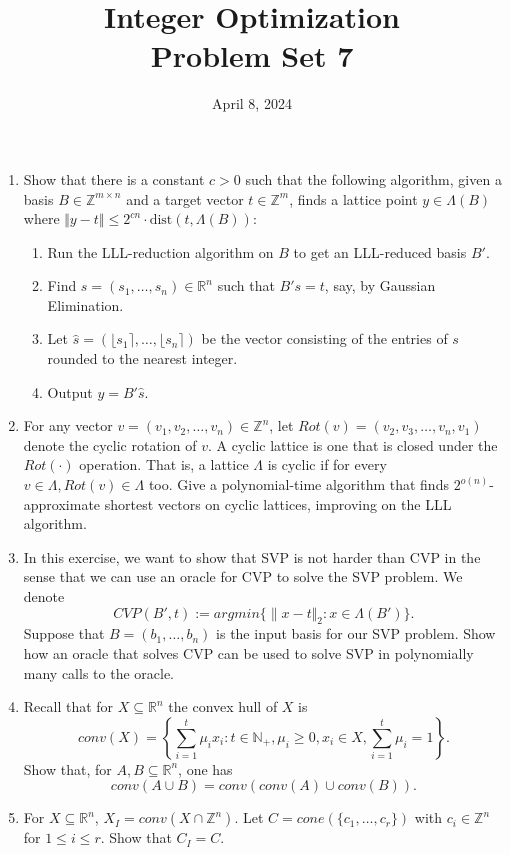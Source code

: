 \documentclass[11pt,a4paper]{article}
\title{Integer Optimization  \\ Problem Set 7 }
\date{ April 8, 2024}
\renewcommand{\leq}{\leqslant}
\renewcommand{\geq}{\geqslant}
\begin{document}
\maketitle 


\begin{enumerate}
\item Show that there is a constant $c > 0$ such that the following algorithm, given a basis $B ∈ \mathbb{Z}^{m×n}$ and a target
vector $t ∈ \mathbb{Z}^m$, finds a lattice point $y ∈ \Lambda(B)$ where
$\Vert y − t \Vert ≤ 2^{cn}  \cdot \text{dist}(t, \Lambda(B))$:
\begin{enumerate}
    \item Run the LLL-reduction algorithm on $B$ to get an LLL-reduced basis $B'$.
    \item Find $s = (s_1, \hdots , s_n) ∈\mathbb{R}^n$ such that $B's = t$, say, by Gaussian Elimination.
    \item Let $\hat{s} =  (⌊s_1⌉,\hdots,⌊s_n⌉)$ be the vector consisting of the entries of $s$ rounded to the nearest integer.
    \item Output $y = B'\hat{s}$.
\end{enumerate}

\item For any vector $v = (v_1,v_2,\hdots,v_n) ∈ \mathbb{Z}^n$, let $Rot(v) = (v_2,v_3,\hdots,v_n,v_1)$ denote the cyclic rotation of $v$. A cyclic lattice is one that is closed under the $Rot(\cdot)$ operation. That is, a lattice $\Lambda$ is cyclic if for every $v ∈ \Lambda, Rot(v) ∈ \Lambda$ too. Give a polynomial-time algorithm that finds $2^{o(n)}$-approximate shortest vectors on cyclic lattices, improving on the LLL algorithm.  

\item In this exercise, we want to show that SVP is not harder than CVP in the sense that we can use an oracle for CVP to solve the SVP problem. We denote $$CVP(B',t):=argmin\{∥x−t\Vert_2:x∈Λ(B')\}.$$ Suppose that $B = (b_1,\hdots,b_n)$ is the input basis for our SVP problem. Show how an oracle that solves CVP can be used to solve SVP in polynomially many calls to the oracle. 

\item Recall that for $X ⊆ \mathbb{R}^n$ the convex hull of $X$ is
 $$conv(X)= \left\{\sum_{i =1}^t μ_ix_i: t∈\mathbb{N}_+,μ_i\geq0,x_i∈X,\sum_{i =1}^t μ_i=1 \right\}.$$
Show that, for $A,B ⊆\mathbb{R}^n$, one has $$conv(A∪B)=conv(conv(A)∪conv(B)).$$

\item For $X⊆\mathbb{R}^n$, $X_I=conv(X∩\mathbb{Z}^n)$.
Let $C=cone(\{c_1,\hdots,c_r\})$ with $c_i ∈ \mathbb{Z}^n$ for $1\leq i\leq r$. Show that $C_I =C$.


\end{enumerate}
\end{document}
